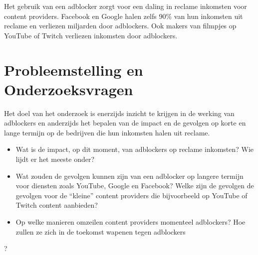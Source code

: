 \documentclass[pdftex,a4paper,12pt,twoside]{report}
\begin{document}
Het gebruik van een adblocker zorgt voor een daling in reclame inkomsten voor content providers. Facebook en Google halen zelfs 90\% van hun inkomsten uit reclame en verliezen miljarden door adblockers. Ook makers van filmpjes op YouTube of Twitch verliezen inkomsten door adblockers.




\section{Probleemstelling en Onderzoeksvragen}
\label{sec:onderzoeksvragen}

Het doel van het onderzoek is enerzijds inzicht te krijgen in de werking van adblockers en anderzijds het bepalen van de impact en de gevolgen op korte en lange termijn op de bedrijven die hun inkomsten halen uit reclame.
\begin{itemize}
	\item Wat is de impact, op dit moment, van adblockers op reclame inkomsten? Wie lijdt er het meeste onder?
\item Wat zouden de gevolgen kunnen zijn van een adblocker op langere termijn voor diensten zoals YouTube, Google en Facebook? Welke zijn de gevolgen de gevolgen voor de “kleine” content providers die bijvoorbeeld op YouTube of Twitch content aanbieden?
\item Op welke manieren omzeilen content providers momenteel adblockers? Hoe zullen ze zich in de toekomst wapenen tegen adblockers
\end{itemize}
?
\end{document}
